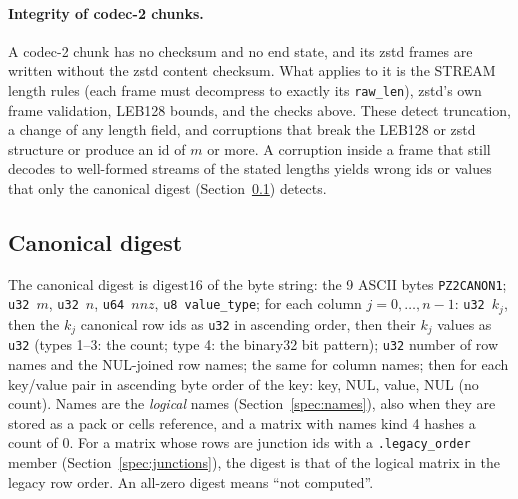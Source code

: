\paragraph{Integrity of codec-2 chunks.}
A codec-2 chunk has no checksum and no end state, and its zstd frames are written without the zstd content checksum.
What applies to it is the STREAM length rules (each frame must decompress to exactly its \texttt{raw\_len}), zstd's own
frame validation, LEB128 bounds, and the checks above. These detect truncation, a change of any length field, and
corruptions that break the LEB128 or zstd structure or produce an id of $m$ or more. A corruption inside a frame that
still decodes to well-formed streams of the stated lengths yields wrong ids or values that only the canonical digest
(Section~\ref{spec:digest}) detects.

\subsection{Canonical digest}
\label{spec:digest}
The canonical digest is $\mathrm{digest16}$ of the byte string: the 9 ASCII bytes \texttt{PZ2CANON1}; \texttt{u32}~$m$,
\texttt{u32}~$n$, \texttt{u64}~$\mathit{nnz}$, \texttt{u8}~\texttt{value\_type}; for each column $j=0,\dots,n-1$:
\texttt{u32}~$k_j$, then the $k_j$ canonical row ids as \texttt{u32} in ascending order, then their $k_j$ values as
\texttt{u32} (types 1--3: the count; type 4: the binary32 bit pattern); \texttt{u32} number of row names and the
NUL-joined row names; the same for column names; then for each key/value pair in ascending byte order of the key: key,
NUL, value, NUL (no count). Names are the \emph{logical} names (Section~\ref{spec:names}), also when they are stored as a
pack or cells reference, and a matrix with names kind 4 hashes a count of 0. For a matrix whose rows are junction ids
with a \texttt{.legacy\_order} member (Section~\ref{spec:junctions}), the digest is that of the logical matrix in the
legacy row order. An all-zero digest means ``not computed''.

